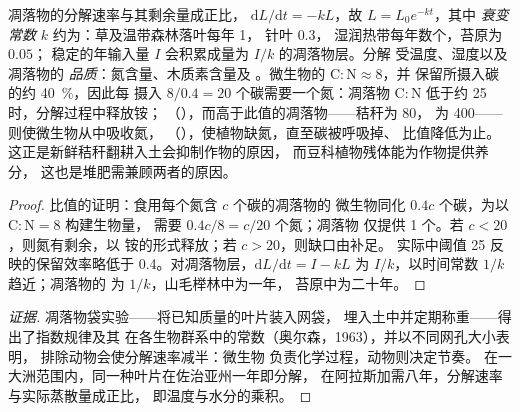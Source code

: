 \begin{theorem}[凋落物分解与碳氮比]\label{thm:b2:living-soil:decay}
凋落物的分解速率与其剩余量成正比，
$\mathrm{d}L/\mathrm{d}t = -kL$，故 $L = L_0 e^{-kt}$，其中
\emph{衰变常数} $k$ 约为：草及温带森林落叶每年 1，
针叶 $0.3$，
湿润热带每年数个，苔原为 $0.05$；
稳定的年输入量 $I$ 会积累成量为 $I/k$ 的凋落物层。分解
受温度、湿度以及凋落物的
\emph{品质}：氮含量、木质素含量及
。微生物的 $\mathrm{C:N} \approx 8$，并
保留所摄入碳的约 \qty{40}{\%}，因此每
摄入 $8/0.4 = 20$ 个碳需要一个氮：凋落物 $\mathrm{C:N}$
低于约 25 时，分解过程中释放铵；
（\emph{}），而高于此值的凋落物——秸秆为 80，
为 400——则使微生物从中吸收氮，
（\emph{}），使植物缺氮，直至碳被呼吸掉、
比值降低为止。这正是新鲜秸秆翻耕入土会抑制作物的原因，
而豆科植物残体能为作物提供养分，
这也是堆肥需兼顾两者的原因。
\end{theorem}
\begin{proof}
比值的证明：食用每个氮含 $c$ 个碳的凋落物的
微生物同化 $0.4c$ 个碳，为以 $\mathrm{C:N} = 8$ 构建生物量，
需要 $0.4c/8 = c/20$ 个氮；凋落物
仅提供 1 个。若 $c < 20$，则氮有剩余，以
铵的形式释放；若 $c > 20$，则缺口由补足。
实际中阈值 25 反映的保留效率略低于
0.4。对凋落物层，$\mathrm{d}L/\mathrm{d}t = I - kL$
为 $I/k$，以时间常数 $1/k$ 趋近；凋落物的
为 $1/k$，山毛榉林中为一年，
苔原中为二十年。
\end{proof}
\begin{proof}[证据]
凋落物袋实验——将已知质量的叶片装入网袋，
埋入土中并定期称重——得出了指数规律及其
在各生物群系中的常数（奥尔森，1963），并以不同网孔大小表明，
排除动物会使分解速率减半：微生物
负责化学过程，动物则决定节奏。
在一大洲范围内，同一种叶片在佐治亚州一年即分解，
在阿拉斯加需八年，分解速率与实际蒸散量成正比，
即温度与水分的乘积。
\end{proof}

